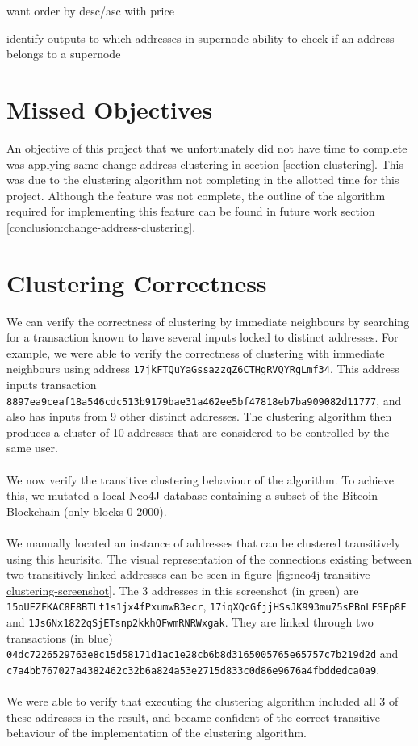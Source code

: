 want order by desc/asc with price

identify outputs to which addresses in supernode
ability to check if an address belongs to a supernode 


\section{Missed Objectives}
An objective of this project that we unfortunately did not have time to complete was applying same change address clustering in section \ref{section-clustering}. This was due to the clustering algorithm not completing in the allotted time for this project. Although the feature was not complete, the outline of the algorithm required for implementing this feature can be found in future work section \ref{conclusion:change-address-clustering}. 








\section{Clustering Correctness}
We can verify the correctness of clustering by immediate neighbours by searching for a transaction known to have several inputs locked to distinct addresses. For example, we were able to verify the correctness of clustering with immediate neighbours using address \texttt{17jkFTQuYaGssazzqZ6CTHgRVQYRgLmf34}. This address inputs transaction \\\texttt{8897ea9ceaf18a546cdc513b9179bae31a462ee5bf47818eb7ba909082d11777}, and also has inputs from 9 other distinct addresses. The clustering algorithm then produces a cluster of 10 addresses that are considered to be controlled by the same user. 
\\\\
We now verify the transitive clustering behaviour of the algorithm.  
To achieve this, we mutated a local Neo4J database containing a subset of the Bitcoin Blockchain (only blocks 0-2000). 
\\\\
We manually located an instance of addresses that can be clustered transitively using this heurisitc. The visual representation of the connections existing between two transitively linked addresses can be seen in figure \ref{fig:neo4j-transitive-clustering-screenshot}. The 3 addresses in this screenshot (in green) are \texttt{15oUEZFKAC8E8BTLt1s1jx4fPxumwB3ecr}, \texttt{17iqXQcGfjjHSsJK993mu75sPBnLFSEp8F} and \texttt{1Js6Nx1822qSjETsnp2kkhQFwmRNRWxgak}. They are linked through two transactions (in blue) \texttt{04dc7226529763e8c15d58171d1ac1e28cb6b8d3165005765e65757c7b219d2d} and \texttt{c7a4bb767027a4382462c32b6a824a53e2715d833c0d86e9676a4fbddedca0a9}. 
\\\\
We were able to verify that executing the clustering algorithm included all 3 of these addresses in the result, and became confident of the correct transitive behaviour of the implementation of the clustering algorithm. 

